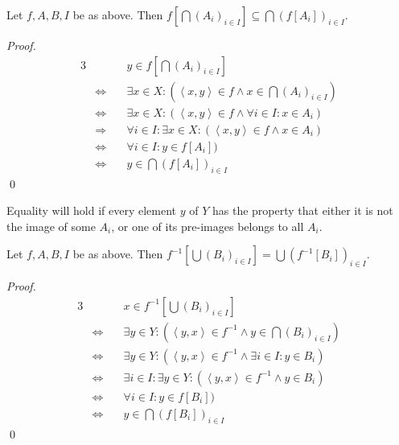 \documentclass[11pt]{llncs}
\begin{document}
\begin{lemma}
  Let $f, A, B, I$ be as above. Then
  $f[\bigcap (A_i)_{i \in I}] \subseteq \bigcap (f[A_i])_{i \in I}$.
\end{lemma}
\begin{proof}
  \begin{alignat*}{3}
                         && y \in f[\bigcap (A_i)_{i \in I}]\\
     &\Leftrightarrow\quad & \exists x \in X: (\left<x, y\right> \in f \land x \in \bigcap (A_i)_{i \in I})\\
     &\Leftrightarrow\quad & \exists x \in X: (\left<x, y\right> \in f \land \forall i \in I: x \in A_i)\\
     &\Rightarrow\quad & \forall i \in I: \exists x \in X: (\left<x, y\right> \in f \land x \in A_i)\\
     &\Leftrightarrow\quad & \forall i \in I: y \in f[A_i])\\
     &\Leftrightarrow\quad & y \in \bigcap (f[A_i])_{i \in I}
  \end{alignat*}
  \qed
\end{proof}

Equality will hold if every element $y$ of $Y$ has the property that either it
is not the image of some $A_i$, or one of its pre-images belongs to all $A_i$.

\begin{lemma}\label{lem:commutativity-inverse-cup}
  Let $f, A, B, I$ be as above. Then
  $f^{-1}[\bigcup (B_i)_{i \in I}] = \bigcup (f^{-1}[B_i])_{i \in I}$.
\end{lemma}
\begin{proof}
  \begin{alignat*}{3}
                         && x \in f^{-1}[\bigcup (B_i)_{i \in I}]\\
     &\Leftrightarrow\quad & \exists y \in Y: (\left<y, x\right> \in f^{-1} \land y \in \bigcap (B_i)_{i \in I})\\
     &\Leftrightarrow\quad & \exists y \in Y: (\left<y, x\right> \in f^{-1} \land \exists i \in I: y \in B_i)\\
     &\Leftrightarrow\quad & \exists i \in I: \exists y \in Y: (\left<y, x\right> \in f^{-1} \land y \in B_i)\\
     &\Leftrightarrow\quad & \forall i \in I: y \in f[B_i])\\
     &\Leftrightarrow\quad & y \in \bigcap (f[B_i])_{i \in I}
  \end{alignat*}
  \qed
\end{proof}
\end{document}
